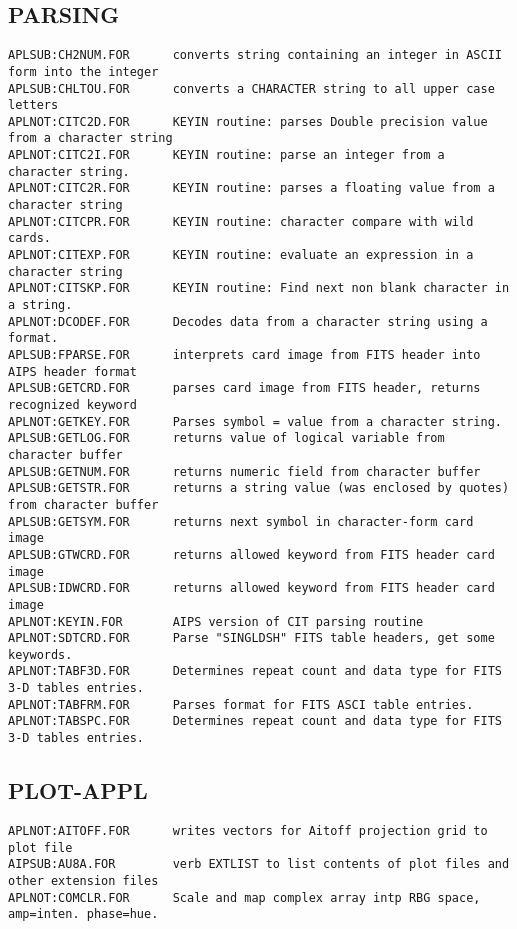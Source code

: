 \subsection{PARSING}
\begin{verbatim}
APLSUB:CH2NUM.FOR      converts string containing an integer in ASCII form into the integer
APLSUB:CHLTOU.FOR      converts a CHARACTER string to all upper case letters
APLNOT:CITC2D.FOR      KEYIN routine: parses Double precision value from a character string
APLNOT:CITC2I.FOR      KEYIN routine: parse an integer from a character string.
APLNOT:CITC2R.FOR      KEYIN routine: parses a floating value from a character string
APLNOT:CITCPR.FOR      KEYIN routine: character compare with wild cards.
APLNOT:CITEXP.FOR      KEYIN routine: evaluate an expression in a character string
APLNOT:CITSKP.FOR      KEYIN routine: Find next non blank character in a string.
APLNOT:DCODEF.FOR      Decodes data from a character string using a format.
APLSUB:FPARSE.FOR      interprets card image from FITS header into AIPS header format
APLSUB:GETCRD.FOR      parses card image from FITS header, returns recognized keyword
APLNOT:GETKEY.FOR      Parses symbol = value from a character string.
APLSUB:GETLOG.FOR      returns value of logical variable from character buffer
APLSUB:GETNUM.FOR      returns numeric field from character buffer
APLSUB:GETSTR.FOR      returns a string value (was enclosed by quotes) from character buffer
APLSUB:GETSYM.FOR      returns next symbol in character-form card image
APLSUB:GTWCRD.FOR      returns allowed keyword from FITS header card image
APLSUB:IDWCRD.FOR      returns allowed keyword from FITS header card image
APLNOT:KEYIN.FOR       AIPS version of CIT parsing routine
APLNOT:SDTCRD.FOR      Parse "SINGLDSH" FITS table headers, get some keywords.
APLNOT:TABF3D.FOR      Determines repeat count and data type for FITS 3-D tables entries.
APLNOT:TABFRM.FOR      Parses format for FITS ASCI table entries.
APLNOT:TABSPC.FOR      Determines repeat count and data type for FITS 3-D tables entries.
\end{verbatim}
 
\subsection{PLOT-APPL}
\begin{verbatim}
APLNOT:AITOFF.FOR      writes vectors for Aitoff projection grid to plot file
AIPSUB:AU8A.FOR        verb EXTLIST to list contents of plot files and other extension files
APLNOT:COMCLR.FOR      Scale and map complex array intp RBG space, amp=inten. phase=hue.
\end{verbatim}
 
